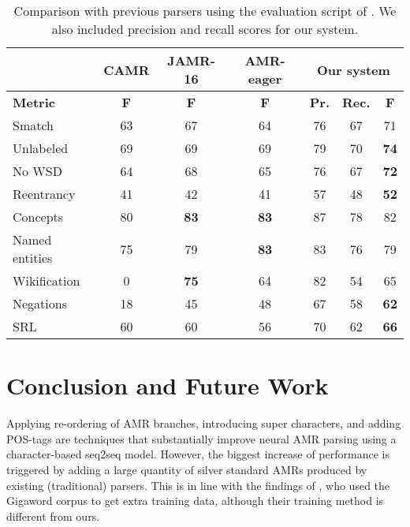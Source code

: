 \documentclass[a4paper,10pt,twoside]{article}
\begin{document}
\begin{table}[!htb]
\centering
\caption{\label{tab:detailedres}Comparison with previous parsers using the evaluation script of \protect{}. We also included precision and recall scores for our system.}
\begin{tabular}{@{}l|ccc|ccc@{}}
\toprule
                  & \textbf{CAMR} & \textbf{JAMR-16} & \textbf{AMR-eager} & \multicolumn{3}{c}{\textbf{Our system}}      \\ \midrule
\textbf{Metric}   & \textbf{F}    & \textbf{F}       & \textbf{F}         & \textbf{Pr.}  & \textbf{Rec.}  & \textbf{F}  \\ \midrule
Smatch            & 63            & 67               & 64                 & 76            & 67             & 71   \\
Unlabeled         & 69            & 69               & 69                 & 79            & 70             & \textbf{74}    \\
No WSD            & 64            & 68               & 65                 & 76            & 67             & \textbf{72}   \\
Reentrancy        & 41            & 42               & 41                 & 57           & 48              & \textbf{52}  \\
Concepts          & 80            & \textbf{83}      & \textbf{83}        & 87           & 78              & 82   \\
Named entities    & 75            & 79               & \textbf{83}        & 83           & 76              & 79   \\
Wikification      & 0             & \textbf{75}      & 64                 & 82           & 54              & 65  \\
Negations         & 18            & 45               & 48                 & 67           & 58              & \textbf{62}   \\
SRL               & 60            & 60               & 56                 & 70           & 62              & \textbf{66}   \\ \bottomrule
\end{tabular}
\end{table}

\section{Conclusion and Future Work}

Applying re-ordering of AMR branches, introducing super characters, and adding POS-tags are techniques that substantially improve neural AMR parsing using a character-based seq2seq model. However, the biggest increase of performance is triggered by adding a large quantity of silver standard AMRs produced by existing (traditional) parsers. This is in line with the findings of , who used the Gigaword corpus to get extra training data, although their training method is different from ours.
\end{document}
